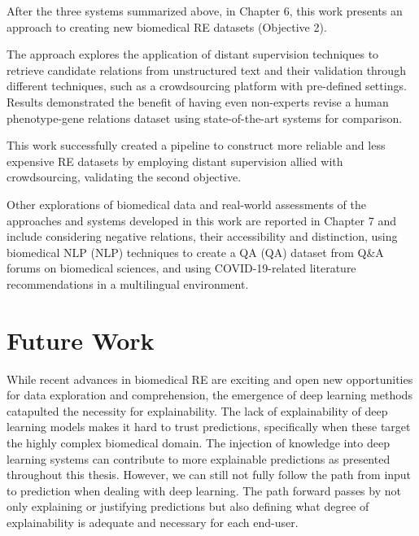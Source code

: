 After the three systems summarized above, in Chapter 6, this work presents an approach to creating new biomedical RE datasets (Objective 2). 

The approach explores the application of distant supervision techniques to retrieve candidate relations from unstructured text and their validation through different techniques, such as a crowdsourcing platform with pre-defined settings. Results demonstrated the benefit of having even non-experts revise a human phenotype-gene relations dataset using state-of-the-art systems for comparison. 

This work successfully created a pipeline to construct more reliable and less expensive RE datasets by employing distant supervision allied with crowdsourcing, validating the second objective. 

Other explorations of biomedical data and real-world assessments of the approaches and systems developed in this work are reported in Chapter 7 and include considering negative relations, their accessibility and distinction, using biomedical \acl{NLP} (NLP) techniques to create a \acl{QA} (QA) dataset from Q\&A forums on biomedical sciences, and using COVID-19-related literature recommendations in a multilingual environment. 

\section{Future Work}

While recent advances in biomedical RE are exciting and open new opportunities for data exploration and comprehension, the emergence of deep learning methods catapulted the necessity for explainability. The lack of explainability of deep learning models makes it hard to trust predictions, specifically when these target the highly complex biomedical domain. The injection of knowledge into deep learning systems can contribute to more explainable predictions as presented throughout this thesis. However, we can still not fully follow the path from input to prediction when dealing with deep learning. The path forward passes by not only explaining or justifying predictions but also defining what degree of explainability is adequate and necessary for each end-user.

